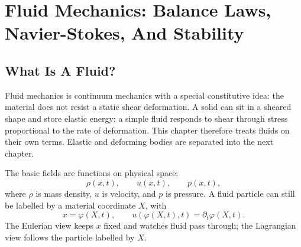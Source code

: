 \chapter[Fluid Mechanics]{Fluid Mechanics: Balance Laws, Navier-Stokes, And Stability}
\label{chap:fluid}

\section{What Is A Fluid?}
\label{sec:what-is-fluid}

Fluid mechanics is continuum mechanics with a special constitutive idea: the
material does not resist a static shear deformation. A solid can sit in a
sheared shape and store elastic energy; a simple fluid responds to shear through
stress proportional to the rate of deformation. This chapter therefore treats
fluids on their own terms. Elastic and deforming bodies are separated into the
next chapter.

The basic fields are functions on physical space:
\[
  \rho(x,t),\qquad u(x,t),\qquad p(x,t),
\]
where \(\rho\) is mass density, \(u\) is velocity, and \(p\) is pressure. A
fluid particle can still be labelled by a material coordinate \(X\), with
\[
  x=\varphi(X,t),\qquad u(\varphi(X,t),t)=\partial_t\varphi(X,t).
\]
The Eulerian view keeps \(x\) fixed and watches fluid pass through; the
Lagrangian view follows the particle labelled by \(X\).

